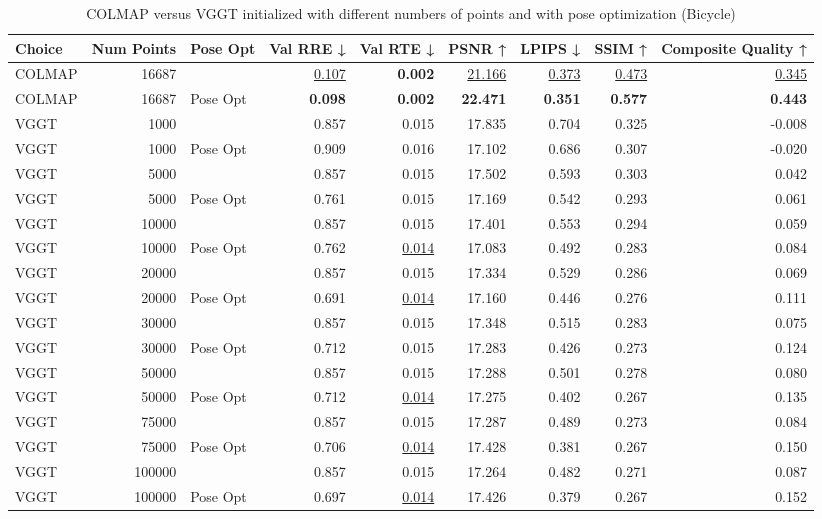 \begin{table}[H]
\caption{COLMAP versus VGGT initialized with different numbers of points and with pose optimization (Bicycle)}
\label{tab:02_num_points_pose_opt_bicycle}
\begin{tabular}{lrlrrrrrr}
\toprule
Choice & Num Points & Pose Opt & Val RRE ↓ & Val RTE ↓ & PSNR ↑ & LPIPS ↓ & SSIM ↑ & Composite Quality ↑ \\
\midrule
COLMAP & 16687 &  & \underline{0.107} & \textbf{0.002} & \underline{21.166} & \underline{0.373} & \underline{0.473} & \underline{0.345} \\
COLMAP & 16687 & Pose Opt & \textbf{0.098} & \textbf{0.002} & \textbf{22.471} & \textbf{0.351} & \textbf{0.577} & \textbf{0.443} \\
VGGT & 1000 &  & 0.857 & 0.015 & 17.835 & 0.704 & 0.325 & -0.008 \\
VGGT & 1000 & Pose Opt & 0.909 & 0.016 & 17.102 & 0.686 & 0.307 & -0.020 \\
VGGT & 5000 &  & 0.857 & 0.015 & 17.502 & 0.593 & 0.303 & 0.042 \\
VGGT & 5000 & Pose Opt & 0.761 & 0.015 & 17.169 & 0.542 & 0.293 & 0.061 \\
VGGT & 10000 &  & 0.857 & 0.015 & 17.401 & 0.553 & 0.294 & 0.059 \\
VGGT & 10000 & Pose Opt & 0.762 & \underline{0.014} & 17.083 & 0.492 & 0.283 & 0.084 \\
VGGT & 20000 &  & 0.857 & 0.015 & 17.334 & 0.529 & 0.286 & 0.069 \\
VGGT & 20000 & Pose Opt & 0.691 & \underline{0.014} & 17.160 & 0.446 & 0.276 & 0.111 \\
VGGT & 30000 &  & 0.857 & 0.015 & 17.348 & 0.515 & 0.283 & 0.075 \\
VGGT & 30000 & Pose Opt & 0.712 & 0.015 & 17.283 & 0.426 & 0.273 & 0.124 \\
VGGT & 50000 &  & 0.857 & 0.015 & 17.288 & 0.501 & 0.278 & 0.080 \\
VGGT & 50000 & Pose Opt & 0.712 & \underline{0.014} & 17.275 & 0.402 & 0.267 & 0.135 \\
VGGT & 75000 &  & 0.857 & 0.015 & 17.287 & 0.489 & 0.273 & 0.084 \\
VGGT & 75000 & Pose Opt & 0.706 & \underline{0.014} & 17.428 & 0.381 & 0.267 & 0.150 \\
VGGT & 100000 &  & 0.857 & 0.015 & 17.264 & 0.482 & 0.271 & 0.087 \\
VGGT & 100000 & Pose Opt & 0.697 & \underline{0.014} & 17.426 & 0.379 & 0.267 & 0.152 \\

\end{tabular}
\end{table}
